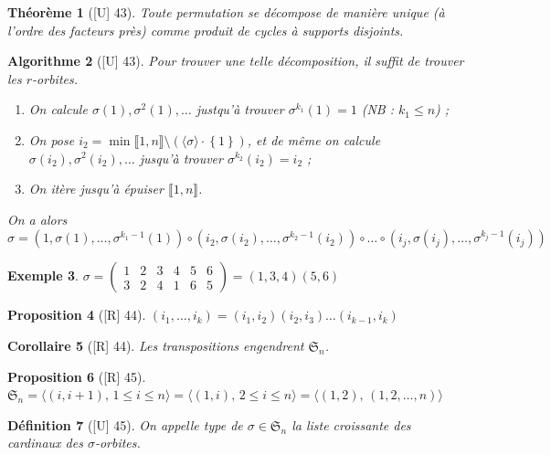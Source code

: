 \documentclass[10pt, a4paper, parskip=full, twoside, twocolumn]{report}
\newtheorem{definition}{Définition}
\newtheorem{theorem}[definition]{Théorème}
\newtheorem{proposition}[definition]{Proposition}
\newtheorem{corollary}[definition]{Corollaire}
\newtheorem{example}[definition]{Exemple}
\newtheorem{algorithm}[definition]{Algorithme}
\begin{document}
\begin{theorem}[\textnormal{[U] 43}]
	Toute permutation se décompose de manière unique (à l'ordre des facteurs près) comme produit de cycles à supports disjoints.
\end{theorem}

\begin{algorithm}[\textnormal{[U] 43}]
	Pour trouver une telle décomposition, il suffit de trouver les $r$-orbites.
	\begin{enumerate}
		\item On calcule $\sigma(1), \sigma^2(1),\dots$ justqu'à trouver $\sigma^{k_1}(1)=1$ (NB : $k_1\leq n$) ;
		\item On pose $i_2 = \min \llbracket 1,n\rrbracket \setminus (\langle\sigma\rangle\cdot\left\{1\right\})$, et de même on calcule $\sigma(i_2),\sigma^2(i_2),\dots$ jusqu'à trouver $\sigma^{k_2}(i_2)=i_2$ ;
		\item On itère jusqu'à épuiser $\llbracket 1,n\rrbracket$.
	\end{enumerate}
	On a alors $\sigma = (1,\sigma(1),\dots,\sigma^{k_1-1}(1))\circ (i_2, \sigma(i_2),\dots,\sigma^{k_2-1}(i_2))\circ \dots \circ(i_j, \sigma(i_j),\dots,\sigma^{k_j-1}(i_j))$
\end{algorithm}

\begin{example}
	$\sigma = \left(\begin{smallmatrix} 
			1 & 2 & 3 & 4 & 5 & 6 \\
			3 & 2 & 4 & 1 & 6 & 5
		\end{smallmatrix}\right) = (1,3,4)(5,6)$
\end{example}

\begin{proposition}[\textnormal{[R] 44}]
		$(i_1,\dots,i_k) = (i_1,i_2)(i_2,i_3)\dots(i_{k-1},i_k)$
\end{proposition}
\begin{corollary}[\textnormal{[R] 44}]
	Les transpositions engendrent $\mathfrak{S}_n$.
\end{corollary}
\begin{proposition}[\textnormal{[R] 45}]
	$\mathfrak{S}_n = \langle(i,i+1),\, 1\leq i\leq n\rangle = \langle (1,i), \, 2\leq i \leq n\rangle = \langle(1,2),\, (1,2,\dots, n) \rangle$
\end{proposition}

\begin{definition}[\textnormal{[U] 45}]
	On appelle \emph{type} de $\sigma\in\mathfrak{S}_n$ la liste croissante des cardinaux des $\sigma$-orbites.
\end{definition}
\end{document}

